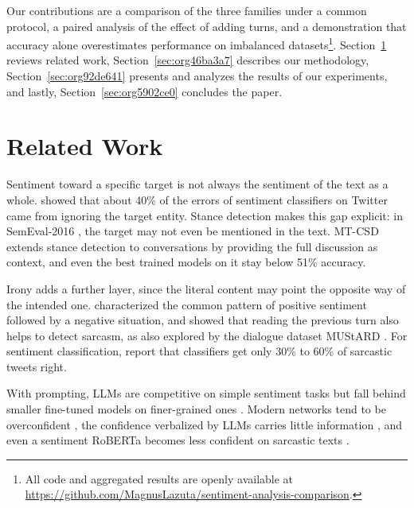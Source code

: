 \documentclass[12pt]{article}
\begin{document}
Our contributions are a comparison of the three families under a common protocol, a paired analysis of the effect of adding turns, and a demonstration that accuracy alone overestimates performance on imbalanced datasets\footnote{All code and aggregated results are openly available at \url{https://github.com/MagnusLazuta/sentiment-analysis-comparison}.}. Section~\ref{sec:org6b495ce} reviews related work, Section~\ref{sec:org46ba3a7} describes our methodology, Section~\ref{sec:org92de641} presents and analyzes the results of our experiments, and lastly, Section~\ref{sec:org5902ce0} concludes the paper.
\section{Related Work}
\label{sec:org6b495ce}

Sentiment toward a specific target is not always the sentiment of the text as a whole. \cite{jiang2011target} showed that about 40\% of the errors of sentiment classifiers on Twitter came from ignoring the target entity. Stance detection makes this gap explicit: in SemEval-2016 \cite{mohammad2016semeval}, the target may not even be mentioned in the text. MT-CSD \cite{niu2024challenge} extends stance detection to conversations by providing the full discussion as context, and even the best trained models on it stay below 51\% accuracy.

Irony adds a further layer, since the literal content may point the opposite way of the intended one. \cite{riloff2013sarcasm} characterized the common pattern of positive sentiment followed by a negative situation, and \cite{ghosh2018sarcasm} showed that reading the previous turn also helps to detect sarcasm, as also explored by the dialogue dataset MUStARD \cite{castro2019towards}. For sentiment classification, \cite{bhargava2025impact} report that classifiers get only 30\% to 60\% of sarcastic tweets right.

With prompting, LLMs are competitive on simple sentiment tasks but fall behind smaller fine-tuned models on finer-grained ones \cite{zhang2023sentiment}. Modern networks tend to be overconfident \cite{guo2017calibration}, the confidence verbalized by LLMs carries little information \cite{xiong2024can}, and even a sentiment RoBERTa becomes less confident on sarcastic texts \cite{shroff2026ai}.
\end{document}
